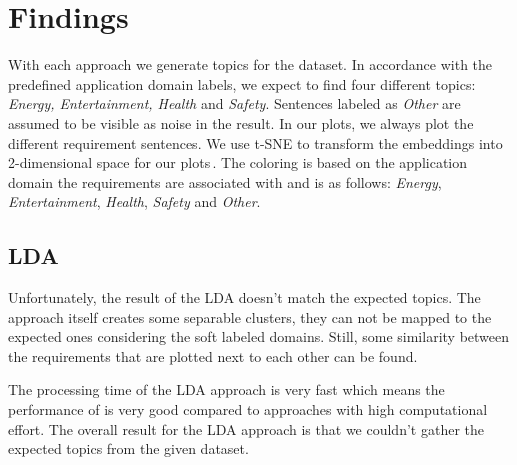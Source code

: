 \section{Findings} %
\label{sec:findings}
With each approach we generate topics for the \crowdre{} dataset. In accordance with the predefined application domain labels, we expect to find four different topics: \textit{Energy, Entertainment, Health} and \textit{Safety}. Sentences labeled as \textit{Other} are assumed to be visible as noise in the result.
In our plots, we always plot the different requirement sentences. We use t-SNE to transform the embeddings into 2-dimensional space for our plots\,\cite{maaten_visualizing_2008}. The coloring is based on the application domain the requirements are associated with and is as follows: \textcolor{clr_energy}{\emph{Energy}}, \textcolor{clr_entertainment}{\emph{Entertainment}}, \textcolor{clr_health}{\emph{Health}}, \textcolor{clr_safety}{\emph{Safety}} and \textcolor{clr_other}{\emph{Other}}.

\subsection{LDA} %
\label{sub:findings_lda}

Unfortunately, the result of the LDA doesn't match the expected topics. The approach itself creates some separable clusters, they can not be mapped to the expected ones considering the soft labeled domains. Still, some similarity between the requirements that are plotted next to each other can be found.

The processing time of the LDA approach is very fast which means the performance of is very good compared to approaches with high computational effort. The overall result for the LDA approach is that we couldn't gather the expected topics from the given dataset. 


